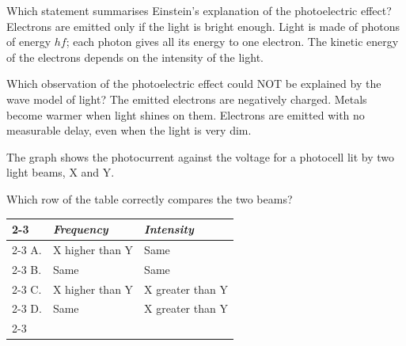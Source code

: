 \begin{quizq}{}
Which statement summarises Einstein's explanation of the photoelectric effect?
  {Electrons are emitted only if the light is bright enough.}
  {Light is made of photons of energy $hf$; each photon gives all its energy to one electron.}
  {The kinetic energy of the electrons depends on the intensity of the light.}
\end{quizq}

\begin{quizq}{}
Which observation of the photoelectric effect could NOT be explained by the wave model of light?
  {The emitted electrons are negatively charged.}
  {Metals become warmer when light shines on them.}
  {Electrons are emitted with no measurable delay, even when the light is very dim.}
\end{quizq}

\begin{quizq}{}
The graph shows the photocurrent against the voltage for a photocell lit by two light beams, X and Y.
\begin{center}
\end{center}
Which row of the table correctly compares the two beams?
\begin{center}
  \renewcommand\arraystretch{1.7}
  \begin{tabular}{@{}p{10mm}|>{\centering\arraybackslash}p{50mm}|>{\centering\arraybackslash}p{50mm}|}
    \cline{2-3}
    & \textit{Frequency} & \textit{Intensity}\\ \cline{2-3}
    A. & X higher than Y & Same\\ \cline{2-3}
    B. & Same & Same\\ \cline{2-3}
    C. & X higher than Y & X greater than Y\\ \cline{2-3}
    D. & Same & X greater than Y\\ \cline{2-3}
  \end{tabular}
\end{center}
\end{quizq}

